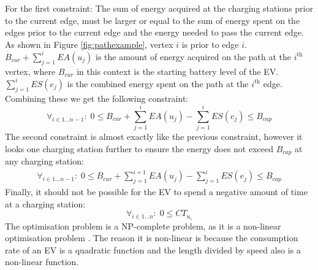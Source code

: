 For the first constraint: The sum of energy acquired at the charging stations prior to the current edge, must be larger or equal to the sum of energy spent on the edges prior to the current edge and the energy needed to pass the current edge. As shown in Figure \ref{fig:pathexample}, vertex $i$ is prior to edge $i$. $B_{cur} + \sum_{j=1}^{i} EA(u_j)$ is the amount of energy acquired on the path at the $i^{\text{th}}$ vertex, where $B_{cur}$ in this context is the starting battery level of the EV. $\sum_{j=1}^{i} ES(e_j)$ is the combined energy spent on the path at the $i^{\text{th}}$ edge. Combining these we get the following constraint:
\begin{equation*}
\forall_{i\in1 \dots n-1 }:\;0 \leq B_{cur} + \sum_{j=1}^{i} EA(u_j) - \sum_{j=1}^{i} ES(e_j) \leq B_{cap}
\end{equation*}
The second constraint is almost exactly like the previous constraint, however it looks one charging station further to ensure the energy does not exceed $B_{cap}$ at any charging station:
\begin{equation*}
\begin{aligned}
\forall_{i\in1 \dots n-1}:\;0 \leq B_{cur} + \sum_{j=1}^{i+1} EA(u_j) - \sum_{j=1}^{i} ES(e_j) \leq B_{cap}
\end{aligned}
\end{equation*}
Finally, it should not be possible for the EV to spend a negative amount of time at a charging station:
\begin{equation*}
\forall_{i\in1 \dots n }:\; 0 \leq CT_{u_i}
\end{equation*}
The optimisation problem is a NP-complete problem, as it is a non-linear optimisation problem \cite{Murty1987}. The reason it is non-linear is because
the consumption rate of an EV is a quadratic function and the length divided by speed also is a non-linear function.
